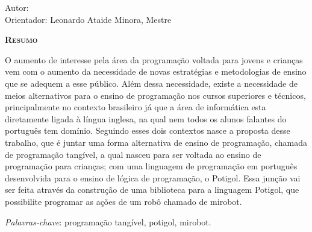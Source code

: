 \begin{center}
	{\Large{\textbf{\ABNTtitulodata}}}
\end{center}

\vspace{1cm}

\begin{flushright}
  Autor: \ABNTautordata\\
  Orientador: Leonardo Ataide Minora, Mestre
\end{flushright}

\vspace{1cm}

\begin{center}
	\Large{\textsc{\textbf{Resumo}}}
\end{center}

\noindent O aumento de interesse pela área da programação voltada para jovens e
crianças vem com o aumento da necessidade de novas estratégias e metodologias
de ensino que se adequem a esse público. Além dessa necessidade, existe a
necessidade de meios alternativos para o ensino de programação nos cursos
superiores e técnicos, principalmente no contexto brasileiro já que a área de
informática esta diretamente ligada à língua inglesa, na qual nem todos os
alunos falantes do português tem domínio. Seguindo esses dois contextos nasce a
proposta desse trabalho, que é juntar uma forma alternativa de ensino de
programação, chamada de programação tangível, a qual nasceu para ser voltada ao
ensino de programação para crianças; com uma linguagem de programação em
português desenvolvida para o ensino de lógica de programação, o Potigol. Essa
junção vai ser feita através da construção de uma biblioteca para a linguagem
Potigol, que possibilite programar as ações de um robô chamado de mirobot.

\noindent\textit{Palavras-chave}: programação tangível, potigol, mirobot.
